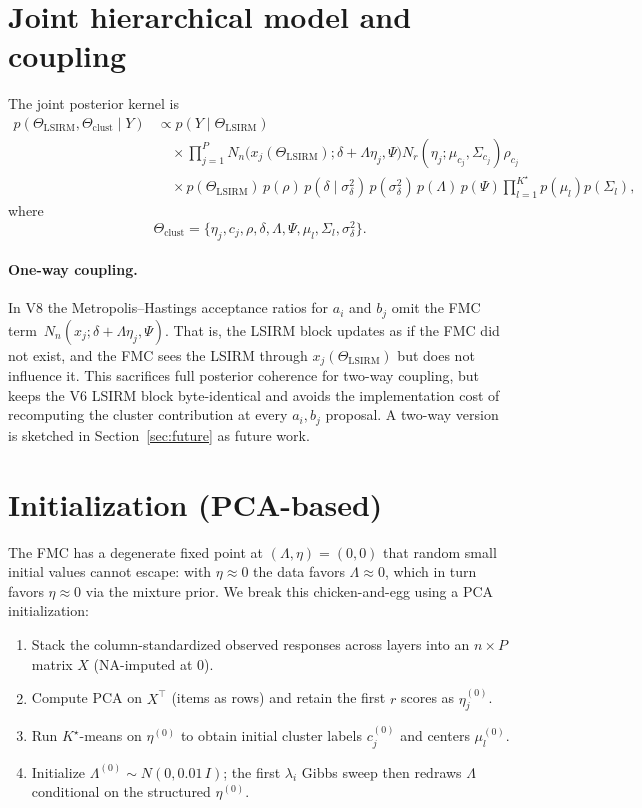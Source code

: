\documentclass[11pt]{article}
\begin{document}
\section{Joint hierarchical model and coupling}

The joint posterior kernel is
\begin{align*}
p(\Theta_{\mathrm{LSIRM}},\Theta_{\mathrm{clust}}\mid Y)
&\propto
p(Y\mid\Theta_{\mathrm{LSIRM}})\\
&\quad\times
\prod_{j=1}^P
N_n\!\bigl(x_j(\Theta_{\mathrm{LSIRM}});\delta+\Lambda\eta_j,\Psi\bigr)
N_r(\eta_j;\mu_{c_j},\Sigma_{c_j})\rho_{c_j}\\
&\quad\times
p(\Theta_{\mathrm{LSIRM}})\,p(\rho)\,
p(\delta\mid\sigma_\delta^2)\,p(\sigma_\delta^2)\,p(\Lambda)\,p(\Psi)
\prod_{l=1}^{K^\star}p(\mu_l)p(\Sigma_l),
\end{align*}
where
\[
\Theta_{\mathrm{clust}}=\{\eta_j,c_j,\rho,\delta,\Lambda,\Psi,\mu_l,\Sigma_l,\sigma_\delta^2\}.
\]

\paragraph{One-way coupling.}
In V8 the Metropolis--Hastings acceptance ratios for $a_i$ and $b_j$ omit the FMC term~$N_n(x_j;\delta+\Lambda\eta_j,\Psi)$.
That is, the LSIRM block updates as if the FMC did not exist, and the FMC sees the LSIRM through $x_j(\Theta_{\mathrm{LSIRM}})$ but does not influence it.
This sacrifices full posterior coherence for two-way coupling, but keeps the V6 LSIRM block byte-identical and avoids the implementation cost of recomputing the cluster contribution at every $a_i,b_j$ proposal.
A two-way version is sketched in Section~\ref{sec:future} as future work.

\section{Initialization (PCA-based)}\label{sec:init}

The FMC has a degenerate fixed point at $(\Lambda,\eta)=(0,0)$ that random small initial values cannot escape: with $\eta\approx 0$ the data favors $\Lambda\approx 0$, which in turn favors $\eta\approx 0$ via the mixture prior.
We break this chicken-and-egg using a PCA initialization:
\begin{enumerate}[leftmargin=2em,label=(\arabic*)]
    \item Stack the column-standardized observed responses across layers into an $n\times P$ matrix $X$ (NA-imputed at $0$).
    \item Compute PCA on $X^\top$ (items as rows) and retain the first $r$ scores as $\eta_j^{(0)}$.
    \item Run $K^\star$-means on $\eta^{(0)}$ to obtain initial cluster labels $c_j^{(0)}$ and centers $\mu_l^{(0)}$.
    \item Initialize $\Lambda^{(0)}\sim N(0,0.01\,I)$; the first $\lambda_i$ Gibbs sweep then redraws $\Lambda$ conditional on the structured $\eta^{(0)}$.
\end{enumerate}
\end{document}
